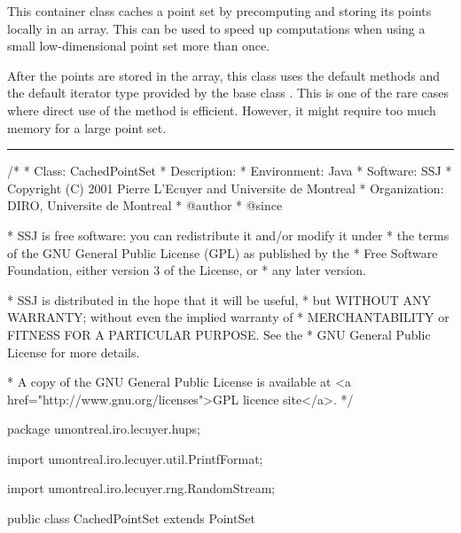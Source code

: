
This container class caches a point set by precomputing
and storing its points locally in an array.
This can be used to speed up computations when using
a small low-dimensional point set more than once.

\begin{detailed} %
After the points are stored in the array, this class uses
the default methods and the default iterator type provided by
the base class .
This is one of the rare cases where direct use of the
 method is efficient.
 However, it might require too much memory for a large point set.
\end{detailed} %


\bigskip\hrule\bigskip

\begin{code}
\begin{hide}
/*
 * Class:        CachedPointSet
 * Description:  
 * Environment:  Java
 * Software:     SSJ 
 * Copyright (C) 2001  Pierre L'Ecuyer and Universite de Montreal
 * Organization: DIRO, Universite de Montreal
 * @author       
 * @since

 * SSJ is free software: you can redistribute it and/or modify it under
 * the terms of the GNU General Public License (GPL) as published by the
 * Free Software Foundation, either version 3 of the License, or
 * any later version.

 * SSJ is distributed in the hope that it will be useful,
 * but WITHOUT ANY WARRANTY; without even the implied warranty of
 * MERCHANTABILITY or FITNESS FOR A PARTICULAR PURPOSE.  See the
 * GNU General Public License for more details.

 * A copy of the GNU General Public License is available at
   <a href="http://www.gnu.org/licenses">GPL licence site</a>.
 */
\end{hide}
package umontreal.iro.lecuyer.hups;\begin{hide}

import umontreal.iro.lecuyer.util.PrintfFormat;
\end{hide}
    import umontreal.iro.lecuyer.rng.RandomStream;


public class CachedPointSet extends PointSet \begin{hide} {
   protected PointSet P;        // Original PointSet which is cached here.
   protected double x[][];      // Cached points.
   protected CachedPointSet() {}
\end{hide}
\end{code}

